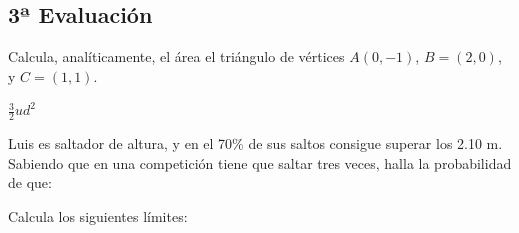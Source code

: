\documentclass[addpoints,spanish, 12pt,a4paper]{exam}
\begin{document}
\begin{questions}
\section*{3ª Evaluación}    

\question[1] Calcula, analíticamente, el área el triángulo de vértices $A(0, -1)$,  $B=(2, 0)$,  y  $C=(1, 1)$.
\begin{solution}
$\frac{3}{2} ud^2$
\end{solution}

\question[1] Luis es saltador de altura, y en el 70\% de sus saltos consigue superar los 2.10 m. Sabiendo que en una competición tiene que saltar tres veces, halla la probabilidad de que:
\begin{multicols}{2}

\end{multicols}        
        
    
        \question[1] Calcula los siguientes límites: 
        \begin{multicols}{2}
\end{multicols}
\end{questions}
\end{document}
